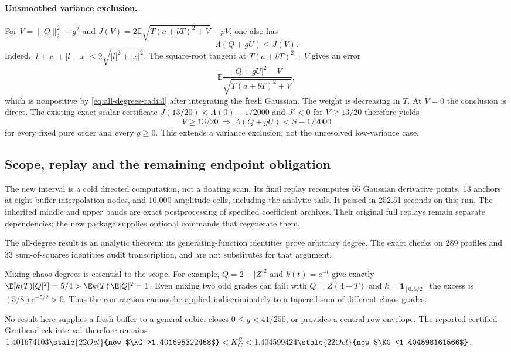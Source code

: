 \paragraph{Unsmoothed variance exclusion.}
For $V=\|Q\|_2^2+g^2$ and
$J(V)=2\mathbb E\sqrt{T(a+bT)^2+V}-pV$, one also has
\begin{equation}
 \Lambda(Q+gU)\le J(V).
 \label{eq:pure-order-trace}
\end{equation}
Indeed,
$|l+x|+|l-x|\le2\sqrt{|l|^2+|x|^2}$.
The square-root tangent at $T(a+bT)^2+V$ gives an error
\[
 \mathbb E
 \frac{|Q+gU|^2-V}{\sqrt{T(a+bT)^2+V}},
\]
which is nonpositive by \eqref{eq:all-degrees-radial} after integrating
the fresh Gaussian. The weight is decreasing in $T$.
At $V=0$ the conclusion is direct.
The existing exact scalar certificate
$J(13/20)<\Lambda(0)-1/2000$ and $J'<0$ for $V\ge13/20$
therefore yields
\[
 \boxed{V\ge13/20\ \Longrightarrow\
 \Lambda(Q+gU)<S-1/2000}
\]
for every fixed pure order and every $g\ge0$.
This extends a variance exclusion, not the unresolved low-variance case.

\subsection{Scope, replay and the remaining endpoint obligation}
The new interval is a cold directed computation, not a floating scan.
Its final replay recomputes 66 Gaussian derivative points, 13 anchors
at eight buffer interpolation nodes, and 10,000 amplitude cells,
including the analytic tails. It passed in 252.51 seconds on this run.
The inherited middle and upper bands are exact postprocessing of
specified coefficient archives. Their original full replays remain
separate dependencies; the new package supplies optional commands
that regenerate them.

The all-degree result is an analytic theorem: its generating-function
identities prove arbitrary degree. The exact checks on 289 profiles
and 33 sum-of-squares identities audit transcription, and are not
substitutes for that argument.

Mixing chaos degrees is essential to the scope. For example,
$Q=2-|Z|^2$ and $k(t)=e^{-t}$ give exactly
$\E[k(T)|Q|^2]=5/4>\E k(T)\,\E|Q|^2=1$.
Even mixing two odd grades can fail: with
$Q=Z(4-T)$ and $k=\mathbf1_{[0,5/2]}$ the excess is
$(5/8)e^{-5/2}>0$. Thus the contraction cannot be applied
indiscriminately to a tapered sum of different chaos grades.

No result here supplies a fresh buffer to a general cubic, closes
$0\le g<41/250$, or provides a central-row envelope. The reported
certified Grothendieck interval therefore remains
$1.401674103\stale{22 Oct}{now $\KG>1.401695322458$}<K_G^{\mathbb C}<1.404599424\stale{22 Oct}{now $\KG<1.404598161566$}$.


